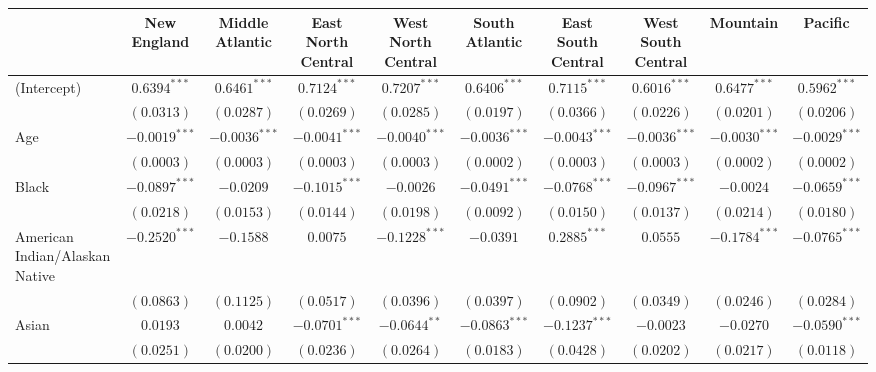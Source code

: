 
\begin{table}
\begin{center}
\begin{tabular}{l c c c c c c c c c}
\hline
 & New England & Middle Atlantic & East North Central & West North Central & South Atlantic & East South Central & West South Central & Mountain & Pacific \\
\hline
(Intercept)                    & $0.6394^{***}$  & $0.6461^{***}$  & $0.7124^{***}$  & $0.7207^{***}$  & $0.6406^{***}$  & $0.7115^{***}$  & $0.6016^{***}$  & $0.6477^{***}$  & $0.5962^{***}$  \\
                               & $(0.0313)$      & $(0.0287)$      & $(0.0269)$      & $(0.0285)$      & $(0.0197)$      & $(0.0366)$      & $(0.0226)$      & $(0.0201)$      & $(0.0206)$      \\
Age                            & $-0.0019^{***}$ & $-0.0036^{***}$ & $-0.0041^{***}$ & $-0.0040^{***}$ & $-0.0036^{***}$ & $-0.0043^{***}$ & $-0.0036^{***}$ & $-0.0030^{***}$ & $-0.0029^{***}$ \\
                               & $(0.0003)$      & $(0.0003)$      & $(0.0003)$      & $(0.0003)$      & $(0.0002)$      & $(0.0003)$      & $(0.0003)$      & $(0.0002)$      & $(0.0002)$      \\
Black                          & $-0.0897^{***}$ & $-0.0209$       & $-0.1015^{***}$ & $-0.0026$       & $-0.0491^{***}$ & $-0.0768^{***}$ & $-0.0967^{***}$ & $-0.0024$       & $-0.0659^{***}$ \\
                               & $(0.0218)$      & $(0.0153)$      & $(0.0144)$      & $(0.0198)$      & $(0.0092)$      & $(0.0150)$      & $(0.0137)$      & $(0.0214)$      & $(0.0180)$      \\
American Indian/Alaskan Native & $-0.2520^{***}$ & $-0.1588$       & $0.0075$        & $-0.1228^{***}$ & $-0.0391$       & $0.2885^{***}$  & $0.0555$        & $-0.1784^{***}$ & $-0.0765^{***}$ \\
                               & $(0.0863)$      & $(0.1125)$      & $(0.0517)$      & $(0.0396)$      & $(0.0397)$      & $(0.0902)$      & $(0.0349)$      & $(0.0246)$      & $(0.0284)$      \\
Asian                          & $0.0193$        & $0.0042$        & $-0.0701^{***}$ & $-0.0644^{**}$  & $-0.0863^{***}$ & $-0.1237^{***}$ & $-0.0023$       & $-0.0270$       & $-0.0590^{***}$ \\
                               & $(0.0251)$      & $(0.0200)$      & $(0.0236)$      & $(0.0264)$      & $(0.0183)$      & $(0.0428)$      & $(0.0202)$      & $(0.0217)$      & $(0.0118)$      \\

\end{tabular}
\end{center}
\end{table}
